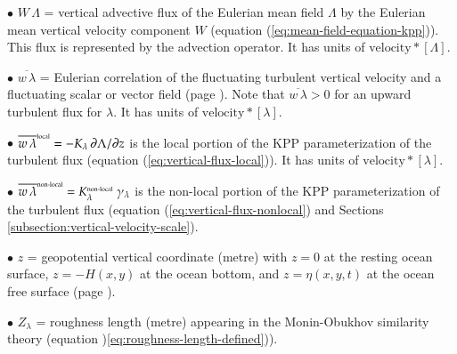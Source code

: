 \begin{trivlist}
\item[$\bullet$] $W \, \Lambda$ = vertical advective flux of the Eulerian mean
  field $\Lambda$ by the Eulerian mean vertical velocity component $W$
  (equation (\ref{eq:mean-field-equation-kpp})). This flux is
  represented by the advection operator.  It has units of
  $\mbox{velocity} * [\Lambda]$.

\item[$\bullet$] $\overline{w \, \lambda}$ = Eulerian correlation of the
  fluctuating turbulent vertical velocity and a fluctuating scalar or
  vector field (page \pageref{correlation_defined}).  Note that
  $\overline{w \, \lambda} > 0$ for an upward turbulent flux for
  $\lambda$.  It has units of $\mbox{velocity} * [\lambda]$.

\item[$\bullet$] $\overline{w \, \lambda}^{\mbox{\tiny local}} =
  -K_{\lambda} \, \partial \Lambda / \partial z$
  is the local portion of the KPP parameterization of the turbulent
  flux (equation (\ref{eq:vertical-flux-local})).  It has units of
  $\mbox{velocity} * [\lambda]$.

\item[$\bullet$] $\overline{w \, \lambda}^{\mbox{\tiny non-local}} =
  K^{\mbox{\tiny non-local}}_{\lambda} \; \gamma_{\lambda}$ is the
  non-local portion of the KPP parameterization of the turbulent flux
  (equation (\ref{eq:vertical-flux-nonlocal}) and Sections
  \ref{subsection:vertical-velocity-scale}).

\item[$\bullet$] $z$ = geopotential vertical coordinate (metre) with $z=0$ at the
  resting ocean surface, $z=-H(x,y)$ at the ocean bottom, and
  $z=\eta(x,y,t)$ at the ocean free surface (page
  \pageref{geopotential_defined}).

\item[$\bullet$] $Z_{\lambda}$ = roughness length (metre) appearing in
  the Monin-Obukhov similarity theory (equation
  )\ref{eq:roughness-length-defined})).

\end{trivlist}  




